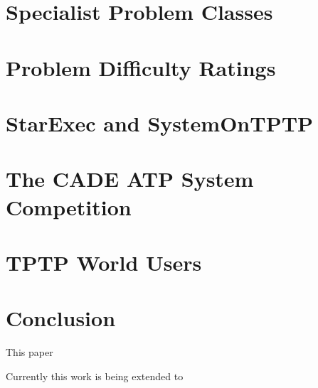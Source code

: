 \documentclass{easychair}
\begin{document}
\section{Specialist Problem Classes}
\label{SPCs}

\section{Problem Difficulty Ratings}
\label{Ratings}

\section{StarExec and SystemOnTPTP}
\label{StarExec}

\section{The CADE ATP System Competition}
\label{CASC}

\section{TPTP World Users}
\label{Users}

\section{Conclusion}
\label{Conclusion}

This paper 

Currently this work is being extended to 



\end{document}

